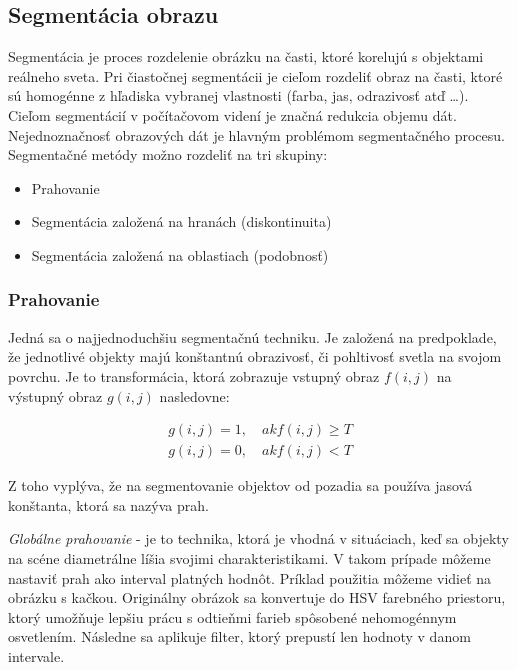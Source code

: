 \subsection{Segmentácia obrazu}
Segmentácia je proces rozdelenie obrázku na časti, ktoré korelujú s objektami reálneho sveta. Pri čiastočnej segmentácii je cieľom rozdeliť obraz na časti, ktoré sú homogénne z hľadiska vybranej vlastnosti (farba, jas, odrazivosť atď …). Cieľom segmentácií v počítačovom videní je značná redukcia objemu dát. Nejednoznačnosť obrazových dát je hlavným problémom segmentačného procesu. Segmentačné metódy možno rozdeliť na tri skupiny: \cite{pocitacove_videnie_v_praxi}


\begin{itemize}
\item Prahovanie
\item Segmentácia založená na hranách (diskontinuita)
\item Segmentácia založená na oblastiach (podobnosť)
\end{itemize}

\subsubsection{Prahovanie}
\label{sec:treasholding}
Jedná sa o najjednoduchšiu segmentačnú techniku. Je založená na predpoklade, že jednotlivé objekty majú konštantnú obrazivosť, či pohltivosť svetla na svojom povrchu. Je to transformácia, ktorá zobrazuje vstupný obraz $f(i, j)$ na výstupný obraz $g(i, j)$ nasledovne: \cite{fit_trasholding} 


\begin{equation}
    \begin{gathered}
        g (i{,}j)=1 {,}\quad {ak} f(i{,}j)\ge T\\ 
        g (i{,}j)=0 {,}\quad {ak} f(i{,}j)  < T
    \end{gathered}
\end{equation}


Z toho vyplýva, že na segmentovanie objektov od pozadia sa používa jasová konštanta, ktorá sa nazýva prah. \cite{pocitacove_videnie_v_praxi}


\textit{Globálne prahovanie} - je to technika, ktorá je vhodná v situáciach, keď sa objekty na scéne diametrálne líšia svojimi charakteristikami. V takom prípade môžeme nastaviť prah ako interval platných hodnôt. Príklad použitia môžeme vidieť na obrázku s kačkou. Originálny obrázok sa konvertuje do HSV farebného priestoru, ktorý umožňuje lepšiu prácu s odtieňmi farieb spôsobené nehomogénnym osvetlením. Následne sa aplikuje filter, ktorý prepustí len hodnoty v danom intervale. \cite{fit_trasholding}\cite{Learning_openCV}

